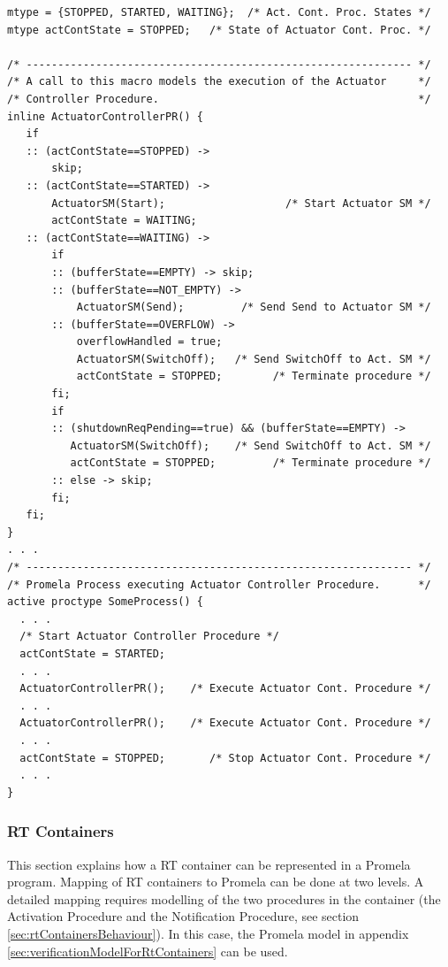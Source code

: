 \documentclass[definition]{../fwprofile}
\begin{document}
\begin{lstlisting}
mtype = {STOPPED, STARTED, WAITING};  /* Act. Cont. Proc. States */ 
mtype actContState = STOPPED;   /* State of Actuator Cont. Proc. */ 

/* ------------------------------------------------------------- */
/* A call to this macro models the execution of the Actuator     */
/* Controller Procedure.                                         */
inline ActuatorControllerPR() {
   if
   :: (actContState==STOPPED) -> 
       skip;    
   :: (actContState==STARTED) -> 
       ActuatorSM(Start);                   /* Start Actuator SM */  
       actContState = WAITING;
   :: (actContState==WAITING) -> 
       if
       :: (bufferState==EMPTY) -> skip;
       :: (bufferState==NOT_EMPTY) ->
           ActuatorSM(Send);         /* Send Send to Actuator SM */
       :: (bufferState==OVERFLOW) ->
           overflowHandled = true;
           ActuatorSM(SwitchOff);   /* Send SwitchOff to Act. SM */
           actContState = STOPPED;        /* Terminate procedure */
       fi;
       if
       :: (shutdownReqPending==true) && (bufferState==EMPTY) ->
          ActuatorSM(SwitchOff);    /* Send SwitchOff to Act. SM */
          actContState = STOPPED;         /* Terminate procedure */
       :: else -> skip;
       fi;
   fi;
} 
. . .
/* ------------------------------------------------------------- */
/* Promela Process executing Actuator Controller Procedure.      */
active proctype SomeProcess() {
  . . .
  /* Start Actuator Controller Procedure */
  actContState = STARTED;
  . . .
  ActuatorControllerPR();    /* Execute Actuator Cont. Procedure */
  . . .
  ActuatorControllerPR();    /* Execute Actuator Cont. Procedure */
  . . .
  actContState = STOPPED;       /* Stop Actuator Cont. Procedure */
  . . .
}  
\end{lstlisting}

\vspace*{-5mm}
\subsubsection{RT Containers}
This section explains how a RT container can be represented in a Promela program. Mapping of RT containers to Promela can be done at two levels. A detailed mapping requires modelling of the two procedures in the container (the Activation Procedure and the Notification Procedure, see section \ref{sec:rtContainersBehaviour}). In this case, the Promela model in appendix \ref{sec:verificationModelForRtContainers} can be used. 
\end{document}
